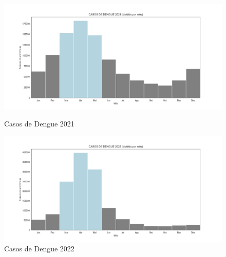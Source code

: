 \documentclass[a4paper, 12pt, twoside]{article}
\begin{document}
\begin{figure}[h]
    \centering
    \begin{minipage}{0.45\textwidth}
        \centering
        \includegraphics[width=\linewidth]{images/casos_dengue_2021.png}
        \caption{Casos de Dengue 2021}
        \label{fig:casos_2021}
    \end{minipage}
    \hfill %
    \begin{minipage}{0.45\textwidth}
        \centering
        \includegraphics[width=\linewidth]{images/casos_dengue_2022.png}
        \caption{Casos de Dengue 2022}
        \label{fig:casos_2022}
    \end{minipage}
\end{figure}
\end{document}
